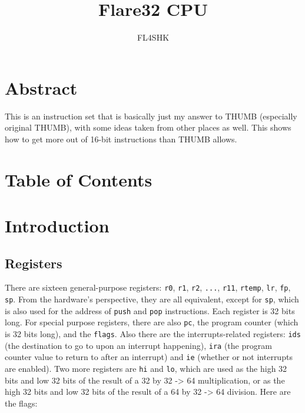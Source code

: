 \documentclass{article}
\title{Flare32 CPU}
\author{FL4SHK}
\makeatletter
\renewcommand\tableofcontents{%
    \@starttoc{toc}%
}
\makeatother
\begin{document}
	\maketitle
	\newpage


	\doublespacing
	\section{Abstract}
	\setcounter{section}{-1}
	This is an instruction set that is basically just my answer to THUMB
	(especially original THUMB), with some ideas taken from other places as
	well.  This shows how to get more out of 16-bit instructions than THUMB
	allows.

	\newpage
	\singlespacing
	\section{Table of Contents}
	\tableofcontents
	\newpage

	\doublespacing
	\section{Introduction}
	\subsection{Registers}
	There are sixteen general-purpose registers:  \texttt{r0}, \texttt{r1},
	\texttt{r2}, \texttt{...}, \texttt{r11}, \texttt{rtemp}, \texttt{lr},
	\texttt{fp}, \texttt{sp}.  From the hardware's perspective, they are
	all equivalent, except for \texttt{sp}, which is also used for the
	address of \texttt{push} and \texttt{pop} instructions.  Each register
	is 32 bits long.  For special purpose registers, there are also
	\texttt{pc}, the program counter (which is 32 bits long), and the
	\texttt{flags}.  Also there are the interrupts-related registers:
	\texttt{ids} (the destination to go to upon an interrupt happening),
	\texttt{ira} (the program counter value to return to after an
	interrupt) and \texttt{ie} (whether or not interrupts are enabled).
	Two more registers are \texttt{hi} and \texttt{lo}, which are used as
	the high 32 bits and low 32 bits of the result of a 32 by 32 -> 64
	multiplication, or as the high 32 bits and low 32 bits of the result of
	a 64 by 32 -> 64 division.  Here are the flags:
\end{document}
